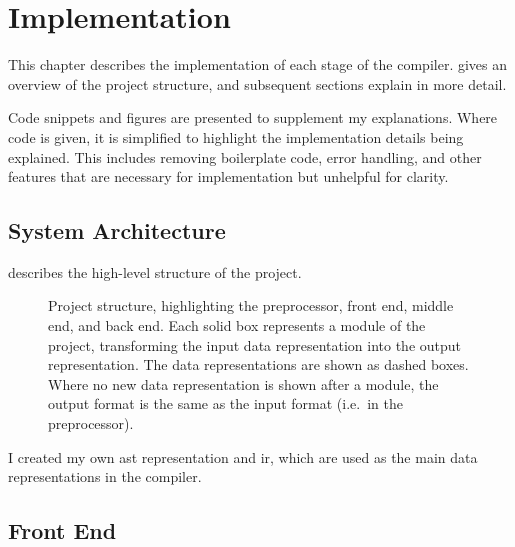 \documentclass[00-main.tex]{subfiles}
\begin{document}
\chapter{Implementation}

This chapter describes the implementation of each stage of the compiler.
 gives an overview of the project structure, and subsequent sections explain in more detail.

Code snippets and figures are presented to supplement my explanations.
Where code is given, it is simplified to highlight the implementation details being explained.
This includes removing boilerplate code, error handling, and other features that are necessary for implementation but unhelpful for clarity.

\section{System Architecture}\label{sec:impl:system architecture}

 describes the high-level structure of the project.

\begin{figure}[!t]
  \centering
  \caption{Project structure, highlighting the preprocessor, front end, middle end, and back end. Each solid box represents a module of the project, transforming the input data representation into the output representation. The data representations are shown as dashed boxes. Where no new data representation is shown after a module, the output format is the same as the input format (i.e.~in the preprocessor).}
  \label{fig:project flowchart} %
\end{figure}

I created my own \gls{ast} representation and \gls{ir}, which are used as the main data representations in the compiler.


\section{Front End}\label{sec:impl:front end}

\end{document}

